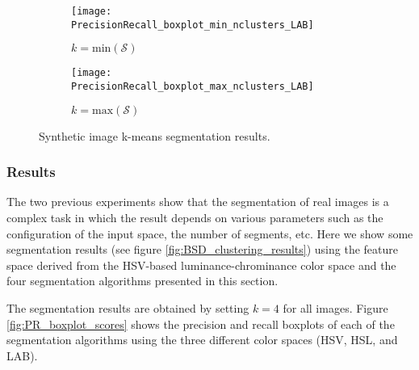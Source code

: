 \begin{figure}[!ht]
    \centering
    \begin{subfigure}[b]{0.49\textwidth}
        \texttt{[image: PrecisionRecall\_boxplot\_min\_nclusters\_LAB]}
        \caption{$k=\mathrm{min}(\mathcal{S})$}
    \end{subfigure}   
    \begin{subfigure}[b]{0.49\textwidth}
    	\centering
    	\texttt{[image: PrecisionRecall\_boxplot\_max\_nclusters\_LAB]}
        \caption{$k=\mathrm{max}(\mathcal{S})$}
    \end{subfigure}     
    
        	    
    \caption{Synthetic image k-means segmentation results.}\label{fig:PR_boxplot_scores_min_max_clusters}    
\end{figure}


\subsubsection{Results}
The two previous experiments show that the segmentation of real images is a complex task in which the result depends on various parameters such as the configuration of the input space, the number of segments, etc. Here we show some segmentation results (see figure \ref{fig:BSD_clustering_results}) using the feature space derived from the HSV-based luminance-chrominance color space and the four segmentation algorithms presented in this section.

The segmentation results are obtained by setting $k = 4$ for all images. Figure \ref{fig:PR_boxplot_scores} shows the precision and recall boxplots of each of the segmentation algorithms using the three different color spaces (HSV, HSL, and LAB).

